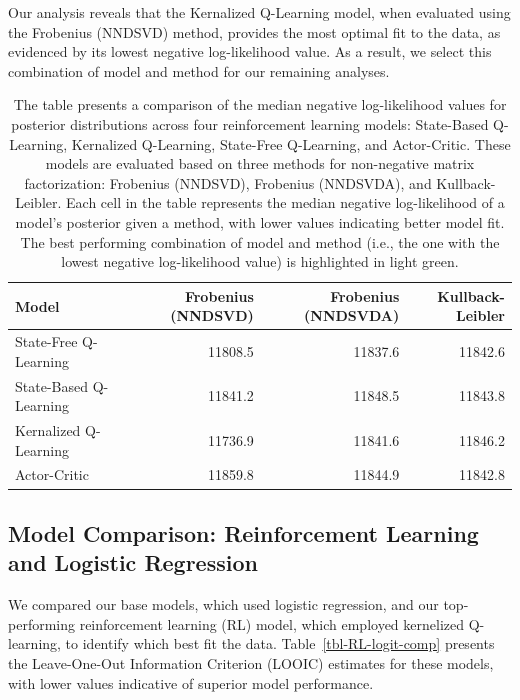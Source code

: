 \documentclass[
  number,
  preprint,
  3p,
  onecolumn]{elsarticle}
\begin{document}
Our analysis reveals that the Kernalized Q-Learning model, when
evaluated using the Frobenius (NNDSVD) method, provides the most optimal
fit to the data, as evidenced by its lowest negative log-likelihood
value. As a result, we select this combination of model and method for
our remaining analyses.

\hypertarget{tbl-choose-RL-model}{}
\begin{longtable}{lrrr}
\caption{\label{tbl-choose-RL-model}The table presents a comparison of the median negative log-likelihood
values for posterior distributions across four reinforcement learning
models: State-Based Q-Learning, Kernalized Q-Learning, State-Free
Q-Learning, and Actor-Critic. These models are evaluated based on three
methods for non-negative matrix factorization: Frobenius (NNDSVD),
Frobenius (NNDSVDA), and Kullback-Leibler. Each cell in the table
represents the median negative log-likelihood of a model's posterior
given a method, with lower values indicating better model fit. The best
performing combination of model and method (i.e., the one with the
lowest negative log-likelihood value) is highlighted in light green. }\tabularnewline

\toprule
Model & Frobenius (NNDSVD) & Frobenius (NNDSVDA) & Kullback-Leibler \\ 
\midrule
State-Free Q-Learning & 11808.5 & 11837.6 & 11842.6 \\ 
State-Based Q-Learning & 11841.2 & 11848.5 & 11843.8 \\ 
Kernalized Q-Learning & 11736.9 & 11841.6 & 11846.2 \\ 
Actor-Critic & 11859.8 & 11844.9 & 11842.8 \\ 
\bottomrule
\end{longtable}

\hypertarget{model-comparison-reinforcement-learning-and-logistic-regression}{%
\subsection{Model Comparison: Reinforcement Learning and Logistic
Regression}\label{model-comparison-reinforcement-learning-and-logistic-regression}}

We compared our base models, which used logistic regression, and our
top-performing reinforcement learning (RL) model, which employed
kernelized Q-learning, to identify which best fit the data.
Table~\ref{tbl-RL-logit-comp} presents the Leave-One-Out Information
Criterion (LOOIC) estimates for these models, with lower values
indicative of superior model performance.
\end{document}
